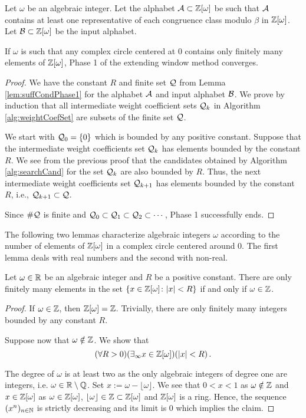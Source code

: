 \begin{theo}
\label{thm:suffCondPhase1}
Let $\omega$ be an algebraic integer. Let the alphabet $\mathcal{A}\subset\mathbb{Z}[\omega]$ be such that $\mathcal{A}$ contains at least one representative of each congruence class modulo $\beta$ in $\mathbb{Z}[\omega]$. Let $\mathcal{B}\subset\mathbb{Z}[\omega]$ be the input alphabet. 

If $\omega$ is such that any complex circle centered at 0 contains only finitely  many elements of $\mathbb{Z}[\omega]$, Phase 1 of the extending window method converges.
\end{theo}
\begin{proof}
We have the constant $R$ and finite set $\mathcal{Q}$ from Lemma \ref{lem:suffCondPhase1} for the alphabet $\mathcal{A}$ and input alphabet $\mathcal{B}$. We prove by induction that  all intermediate weight coefficient sets $\mathcal{Q}_k$ in Algorithm \ref{alg:weightCoefSet} are subsets of the finite set $\mathcal{Q}$. 

We start with $\mathcal{Q}_0=\{0\}$ which is bounded by any positive constant. Suppose that the intermediate weight coefficients set $\mathcal{Q}_k$ has elements bounded by the constant $R$. We see from the previous  proof that the candidates obtained by Algorithm \ref{alg:searchCand} for the set $\mathcal{Q}_k$ are also bounded by $R$. Thus, the next intermediate weight coefficients set $\mathcal{Q}_{k+1}$ has elements bounded by the constant $R$, i.e., $\mathcal{Q}_{k+1}\subset\mathcal{Q}$. 

Since $\#\mathcal{Q}$ is finite and $\mathcal{Q}_0\subset\mathcal{Q}_1\subset\mathcal{Q}_2\subset\cdots$,  Phase 1 successfully ends. 
\end{proof}



The following two lemmas characterize algebraic integers $\omega$ according to the number of elements of $\mathbb{Z}[\omega]$ in a complex circle centered around 0. The first lemma deals with real numbers and the second with non-real.
\begin{lem}
\label{lem:numElemRR}
Let $\omega\in\mathbb{R}$ be an algebraic integer and $R$ be a positive constant. There are only finitely many elements in the set $\left\{x \in\mathbb{Z}[\omega] \colon |x|<R \right\}$ if and only if $\omega \in \mathbb{Z}$. 
\end{lem}
\begin{proof}
If $\omega \in \mathbb{Z}$, then $\mathbb{Z}[\omega] = \mathbb{Z}$. Trivially, there are only finitely many integers bounded by any constant $R$.

Suppose now that $\omega \notin \mathbb{Z}$. We show that 
$$
(\forall R>0) (\exists_\infty x\in \mathbb{Z}[\omega])(|x|<R)\,.
$$ 

The degree of $\omega$ is at least two as the only algebraic integers of degree one are integers, i.e. $\omega \in \mathbb{R} \setminus \mathbb{Q}$. 
Set $x:= \omega- \lfloor \omega \rfloor$. We see that $0<x<1$ as $\omega \notin \mathbb{Z}$ and $x \in \mathbb{Z}[\omega]$ as $\omega \in \mathbb{Z}[\omega]$, $\lfloor \omega \rfloor \in  \mathbb{Z}\subset\mathbb{Z}[\omega]$ and $\mathbb{Z}[\omega]$ is a ring. 
Hence, the sequence $(x^n)_{n\in \mathbb{N}}$ is strictly decreasing and its limit is 0 which implies the claim.
\end{proof}



